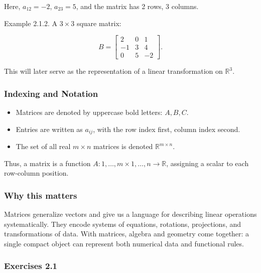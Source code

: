 \documentclass[
  12pt,
  a4paper,
]{article}
\begin{document}
Here, \(a_{12} = -2\), \(a_{23} = 5\), and the matrix has 2 rows, 3
columns.

Example 2.1.2. A \(3 \times 3\) square matrix:

\[B = \begin{bmatrix}
2 & 0 & 1 \\
-1 & 3 & 4 \\
0 & 5 & -2
\end{bmatrix}.\]

This will later serve as the representation of a linear transformation
on \(\mathbb{R}^3\).

\subsubsection{Indexing and Notation}\label{indexing-and-notation}

\begin{itemize}
\item
  Matrices are denoted by uppercase bold letters: \(A, B, C\).
\item
  Entries are written as \(a_{ij}\), with the row index first, column
  index second.
\item
  The set of all real \(m \times n\) matrices is denoted
  \(\mathbb{R}^{m \times n}\).
\end{itemize}

Thus, a matrix is a function
\(A: {1,\dots,m} \times {1,\dots,n} \to \mathbb{R}\), assigning a scalar
to each row-column position.

\subsubsection{Why this matters}\label{why-this-matters-4}

Matrices generalize vectors and give us a language for describing linear
operations systematically. They encode systems of equations, rotations,
projections, and transformations of data. With matrices, algebra and
geometry come together: a single compact object can represent both
numerical data and functional rules.

\subsubsection{Exercises 2.1}\label{exercises-21}
\end{document}
